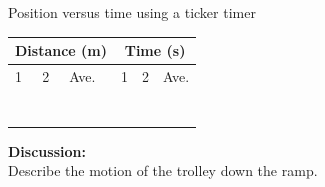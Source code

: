 \begin{g_experiment}{Position versus time using a ticker timer}
        \par 
          \begin{table}[H]
        \begin{center}
      \label{m38795*id7141349}
      \begin{tabular}{|l|l|l|l|l|l|}\hline
    \multicolumn{3}{|c|}{Distance (m)}
     &
    \multicolumn{3}{c|}{Time (s)}
     \\ \hline
        1 &
        2 &
        Ave. &
        1 &
        2 &
        Ave. \\ \hline
         &
         &
         &
         &
         &
      \\ \hline
         &
         &
         &
         &
         &
       \\ \hline
         &
         &
         &
         &
         &
       \\ \hline
         &
         &
         &
         &
         &
        \\ \hline
         &
         &
         &
         &
         &
        \\ \hline
         &
         &
         &
         &
         &
       \\ \hline
         &
         &
         &
         &
         &
      \\ \hline
    \end{tabular}
      \end{center}
\end{table}
    \par
        \label{m38795*id7172254}\noindent{}\textbf{Discussion:}\\
Describe the motion of the trolley down the ramp. 
\end{g_experiment}
\par \label{m38795*cid9}
